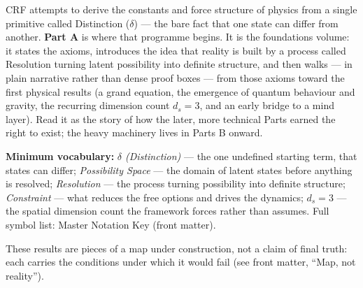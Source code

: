\documentclass[12pt, a4paper]{article}
\begin{document}
\begin{abstract}
\textbf{v17.0 integrity:} Part~XIII (Trilogy): 3 companion papers integrated as coherent
sequence ($\sim 1{,}450$ lines added). Part~XIV (Methodology): Gauge Fix Rule, Reclassification,
PoD Enrichment ($\sim 350$ lines added). K35 Format Drift correction applied. Total
$\approx 8{,}900$ lines; 5+ new sections; 12+ derived/key/formal/openq boxes;
17+ Master Status Table rows reclassified with Gauge column.
\textbf{All v16.1 content preserved verbatim} (No-Loss audit confirmed).
Standalone reference documents (CRF\_Gauge\_Fix\_Rule\_v1\_0.md;
CRF\_v17\_Reclassification\_Table.md; CRF\_Noether\_StepD\_Recommendations.md) are
authoritative companions to this edition.
\end{abstract}

\clearpage
{\setlength{\parskip}{0pt}%
\tableofcontents
}
\clearpage

\begin{keybox}[title={If you are just arriving --- Part A in plain language}]
\sloppy
CRF attempts to derive the constants and force structure of physics from a
single primitive called Distinction ($\delta$) --- the bare fact that one state
can differ from another. \textbf{Part A} is where that programme begins. It is
the foundations volume: it states the axioms, introduces the idea that reality
is built by a process called Resolution turning latent possibility into definite
structure, and then walks --- in plain narrative rather than dense proof boxes
--- from those axioms toward the first physical results (a grand equation,
the emergence of quantum behaviour and gravity, the recurring dimension count
$d_s=3$, and an early bridge to a mind layer). Read it as the story of how the
later, more technical Parts earned the right to exist; the heavy machinery lives
in Parts B onward.

\textbf{Minimum vocabulary:}
\textit{$\delta$ (Distinction)} --- the one undefined starting term, that states
can differ;\;
\textit{Possibility Space} --- the domain of latent states before anything is
resolved;\;
\textit{Resolution} --- the process turning possibility into definite structure;\;
\textit{Constraint} --- what reduces the free options and drives the dynamics;\;
\textit{$d_s=3$} --- the spatial dimension count the framework forces rather than
assumes.
Full symbol list: Master Notation Key (front matter).

These results are pieces of a map under construction, not a claim of final
truth: each carries the conditions under which it would fail (see front
matter, ``Map, not reality'').
\end{keybox}
\end{document}
